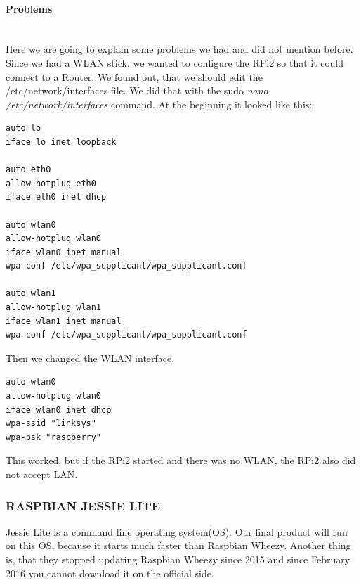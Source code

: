 \paragraph{Problems} \mbox{}\\
Here we are going to explain some problems we had and did not mention before.\newline
Since we had a WLAN stick, we wanted to configure the RPi2 so that it could connect to a Router. We found out, that we should edit the /etc/network/interfaces file. We did that with the sudo \textit{nano /etc/network/interfaces} command.\newline
At the beginning it looked like this:
\begin{verbatim}
auto lo
iface lo inet loopback

auto eth0
allow-hotplug eth0
iface eth0 inet dhcp

auto wlan0
allow-hotplug wlan0
iface wlan0 inet manual
wpa-conf /etc/wpa_supplicant/wpa_supplicant.conf

auto wlan1
allow-hotplug wlan1
iface wlan1 inet manual
wpa-conf /etc/wpa_supplicant/wpa_supplicant.conf
\end{verbatim}
Then we changed the WLAN interface.
\begin{verbatim}
auto wlan0
allow-hotplug wlan0
iface wlan0 inet dhcp
wpa-ssid "linksys"
wpa-psk "raspberry"
\end{verbatim}
This worked, but  if the RPi2 started and there was no WLAN, the RPi2 also did not accept LAN.
\newpage
\subsubsection{RASPBIAN JESSIE LITE}
Jessie Lite is a command line operating system(OS). Our final product will run on this OS, because it starts much faster than Raspbian Wheezy. Another thing is, that they stopped updating Raspbian Wheezy since 2015 and since February 2016 you cannot download it on the official side.

